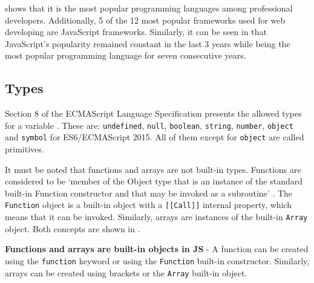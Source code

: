  shows that it is the most popular programming languages among professional developers. Additionally, 5 of the 12 most popular frameworks used for web developing are JavaScript frameworks. Similarly, it can be seen in  that JavaScript's popularity remained constant in the last 3 years while being the most popular programming language for seven consecutive years.






\subsection{Types}
Section 8 of the ECMAScript Language Specification presents the allowed types for a variable \citep{ecma-script}. These are: \texttt{undefined}, \texttt{null}, \texttt{boolean}, \texttt{string}, \texttt{number}, \texttt{object} and \texttt{symbol} for ES6/ECMAScript 2015. All of them except for \texttt{object} are called primitives.

It must be noted that functions and arrays are not built-in types. Functions are considered to be `member of the Object type that is an instance of the standard built-in Function constructor and that may be invoked as a subroutine' \citep{ecma-script}. The \texttt{Function} object is a built-in object with a \texttt{[[Call]]} internal property, which means that it can be invoked. Similarly, arrays are instances of the built-in \texttt{Array} object. Both concepts are shown in .

\begin{code}
	\captionsetup{aboveskip=0pt, belowskip=10pt}
	\caption[Functions and arrays are built-in objects in JS]{\textbf{Functions and arrays are built-in objects in JS} - A function can be created using the \texttt{function} keyword or using the \texttt{Function} built-in constructor. Similarly, arrays can be created using brackets or the \texttt{Array} built-in object.}
	\label{code:background-functions-and-arrays}
\end{code}

